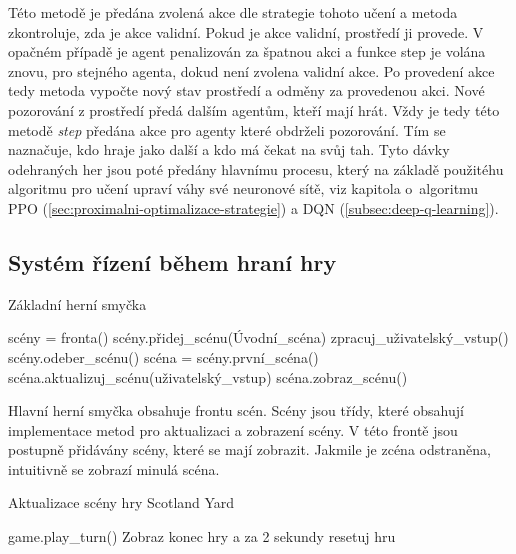 Této metodě je předána zvolená akce dle strategie tohoto učení a metoda zkontroluje, zda je akce validní.
Pokud je akce validní, prostředí ji provede.
V opačném případě je agent penalizován za špatnou akci a funkce step je volána znovu, pro stejného agenta, dokud není zvolena validní akce.
Po provedení akce tedy metoda vypočte nový stav prostředí a odměny za provedenou akci.
Nové pozorování z prostředí předá dalším agentům, kteří mají hrát.
Vždy je tedy této metodě \emph{step} předána akce pro agenty které obdrželi pozorování.
Tím se naznačuje, kdo hraje jako další a kdo má čekat na svůj tah.
Tyto dávky odehraných her jsou poté předány hlavnímu procesu, který na základě použitéhu algoritmu pro učení upraví váhy své neuronové sítě, viz kapitola o~algoritmu PPO (\ref{sec:proximalni-optimalizace-strategie}) a DQN (\ref{subsec:deep-q-learning}).

\subsection{Systém řízení během hraní hry}

\begin{algorithm}[H]
  \begin{algorithmic}
    \caption{Základní herní smyčka}
    \label{alg:GameController}
      \State scény = fronta()
      \State scény.přidej\_scénu(Úvodní\_scéna)
      \State
        \State zpracuj\_uživatelský\_vstup()
          \State scény.odeber\_scénu()
        \EndIf
        \State scéna = scény.první\_scéna()
        \State scéna.aktualizuj\_scénu(uživatelský\_vstup)
        \State scéna.zobraz\_scénu()
      \EndWhile
  \end{algorithmic}
\end{algorithm}

Hlavní herní smyčka obsahuje frontu scén.
Scény jsou třídy, které obsahují implementace metod pro aktualizaci a zobrazení scény.
V této frontě jsou postupně přidávány scény, které se mají zobrazit.
Jakmile je zcéna odstraněna, intuitivně se zobrazí minulá scéna.

\begin{algorithm}[H]
  \caption{Aktualizace scény hry Scotland Yard}
  \label{alg:GameScene}
  \begin{algorithmic}
      \State game.play\_turn()
        \State Zobraz konec hry a za 2 sekundy resetuj hru
      \EndIf
    \EndIf
  \end{algorithmic}
\end{algorithm}

